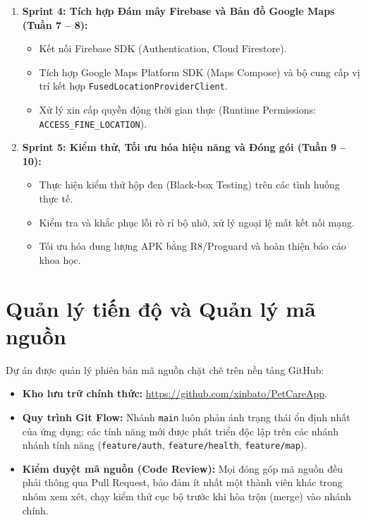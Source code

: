 \begin{enumerate}
    \item \textbf{Sprint 4: Tích hợp Đám mây Firebase và Bản đồ Google Maps (Tuần 7 -- 8):}
    \begin{itemize}
        \item Kết nối Firebase SDK (Authentication, Cloud Firestore).
        \item Tích hợp Google Maps Platform SDK (Maps Compose) và bộ cung cấp vị trí kết hợp \texttt{FusedLocationProviderClient}.
        \item Xử lý xin cấp quyền động thời gian thực (Runtime Permissions: \texttt{ACCESS\_FINE\_LOCATION}).
    \end{itemize}

    \item \textbf{Sprint 5: Kiểm thử, Tối ưu hóa hiệu năng và Đóng gói (Tuần 9 -- 10):}
    \begin{itemize}
        \item Thực hiện kiểm thử hộp đen (Black-box Testing) trên các tình huống thực tế.
        \item Kiểm tra và khắc phục lỗi rò rỉ bộ nhớ, xử lý ngoại lệ mất kết nối mạng.
        \item Tối ưu hóa dung lượng APK bằng R8/Proguard và hoàn thiện báo cáo khoa học.
    \end{itemize}
\end{enumerate}

\section{Quản lý tiến độ và Quản lý mã nguồn}
\label{sec:quan_ly_tien_do}

Dự án được quản lý phiên bản mã nguồn chặt chẽ trên nền tảng GitHub:
\begin{itemize}
    \item \textbf{Kho lưu trữ chính thức:} \url{https://github.com/xinbato/PetCareApp}.
    \item \textbf{Quy trình Git Flow:} Nhánh \texttt{main} luôn phản ánh trạng thái ổn định nhất của ứng dụng; các tính năng mới được phát triển độc lập trên các nhánh nhánh tính năng (\texttt{feature/auth}, \texttt{feature/health}, \texttt{feature/map}).
    \item \textbf{Kiểm duyệt mã nguồn (Code Review):} Mọi đóng góp mã nguồn đều phải thông qua Pull Request, bảo đảm ít nhất một thành viên khác trong nhóm xem xét, chạy kiểm thử cục bộ trước khi hòa trộn (merge) vào nhánh chính.
\end{itemize}

